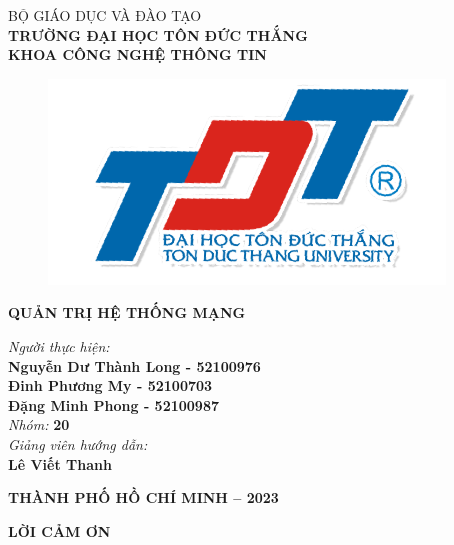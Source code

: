 \documentclass[13pt]{report}
\begin{document}
	\fontsize{14pt}{20pt}\selectfont
	\begin{center}
		BỘ GIÁO DỤC VÀ ĐÀO TẠO\\
		\textbf{TRƯỜNG ĐẠI HỌC TÔN ĐỨC THẮNG}\\
		\textbf{KHOA CÔNG NGHỆ THÔNG TIN} \\
		\vspace*{1cm}
	\end{center}
	\begin{figure}[h]
		\centering
		\includegraphics[width=0.5\linewidth]{image/logo.png}\\\vspace*{1cm}	
	\end{figure}
	\fontsize{20pt}{20pt}\selectfont
	\begin{center}
		\textbf{QUẢN TRỊ HỆ THỐNG MẠNG}
	\end{center}
	\vspace{2cm}
	\fontsize{16pt}{20pt}\selectfont
	\begin{flushright}			
		\textit{Người thực hiện:} \\
		\textbf{Nguyễn Dư Thành Long - 52100976}\\
		\textbf{Đinh Phương My - 52100703}\\
		\textbf{Đặng Minh Phong - 52100987}\\\vspace{0.5cm}
		\textit{Nhóm:}
		\textbf{20}\\\vspace{0.5cm}
		\textit{Giảng viên hướng dẫn:} \\
		\textbf{Lê Viết Thanh}
	\end{flushright}
	\vspace{2cm}
	\fontsize{16pt}{20pt}
	\begin{center}
		\textbf{THÀNH PHỐ HỒ CHÍ MINH – 2023}
	\end{center}
	\newpage
	\pagestyle{fancy}
	\chead{}
	\newpage
	\setcounter{page}{1}
	\newpage
	\begin{center}
		\textbf{LỜI CẢM ƠN}
	\end{center}
\end{document}
